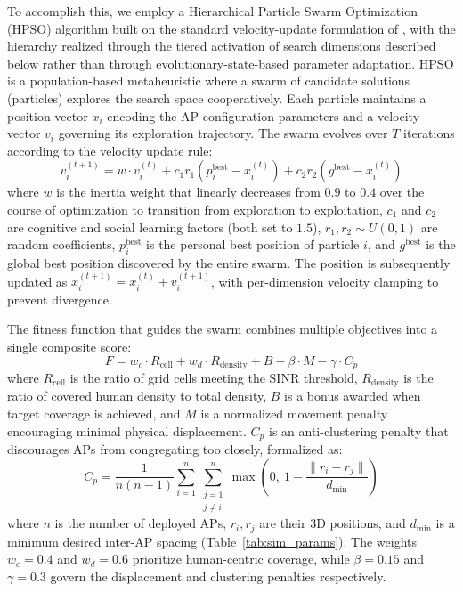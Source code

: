 \documentclass[conference]{IEEEtran}
\begin{document}
To accomplish this, we employ a Hierarchical Particle Swarm Optimization (HPSO) algorithm built on the standard velocity-update formulation of \cite{b11,b13}, with the hierarchy realized through the tiered activation of search dimensions described below rather than through evolutionary-state-based parameter adaptation. HPSO is a population-based metaheuristic where a swarm of candidate solutions (particles) explores the search space cooperatively. Each particle maintains a position vector $x_i$ encoding the AP configuration parameters and a velocity vector $v_i$ governing its exploration trajectory. The swarm evolves over $T$ iterations according to the velocity update rule:
\begin{equation}
    v_i^{(t+1)} = w \cdot v_i^{(t)} + c_1 r_1 (p_i^{\text{best}} - x_i^{(t)}) + c_2 r_2 (g^{\text{best}} - x_i^{(t)})
    \label{eq:pso_velocity}
\end{equation}
where $w$ is the inertia weight that linearly decreases from $0.9$ to $0.4$ over the course of optimization to transition from exploration to exploitation, $c_1$ and $c_2$ are cognitive and social learning factors (both set to $1.5$), $r_1, r_2 \sim U(0,1)$ are random coefficients, $p_i^{\text{best}}$ is the personal best position of particle $i$, and $g^{\text{best}}$ is the global best position discovered by the entire swarm. The position is subsequently updated as $x_i^{(t+1)} = x_i^{(t)} + v_i^{(t+1)}$, with per-dimension velocity clamping to prevent divergence.

The fitness function that guides the swarm combines multiple objectives into a single composite score:
\begin{equation}
    F = w_c \cdot R_{\text{cell}} + w_d \cdot R_{\text{density}} + B - \beta \cdot M - \gamma \cdot C_p
    \label{eq:fitness}
\end{equation}
where $R_{\text{cell}}$ is the ratio of grid cells meeting the SINR threshold, $R_{\text{density}}$ is the ratio of covered human density to total density, $B$ is a bonus awarded when target coverage is achieved, and $M$ is a normalized movement penalty encouraging minimal physical displacement. $C_p$ is an anti-clustering penalty that discourages APs from congregating too closely, formalized as:
\begin{equation}
    C_p = \frac{1}{n(n-1)} \sum_{i=1}^{n}\sum_{\substack{j=1 \\ j \ne i}}^{n} \max\left(0,\ 1 - \frac{\|r_i - r_j\|}{d_{\min}}\right)
    \label{eq:clustering_penalty}
\end{equation}
where $n$ is the number of deployed APs, $r_i, r_j$ are their 3D positions, and $d_{\min}$ is a minimum desired inter-AP spacing (Table~\ref{tab:sim_params}). The weights $w_c = 0.4$ and $w_d = 0.6$ prioritize human-centric coverage, while $\beta = 0.15$ and $\gamma = 0.3$ govern the displacement and clustering penalties respectively.
\end{document}
